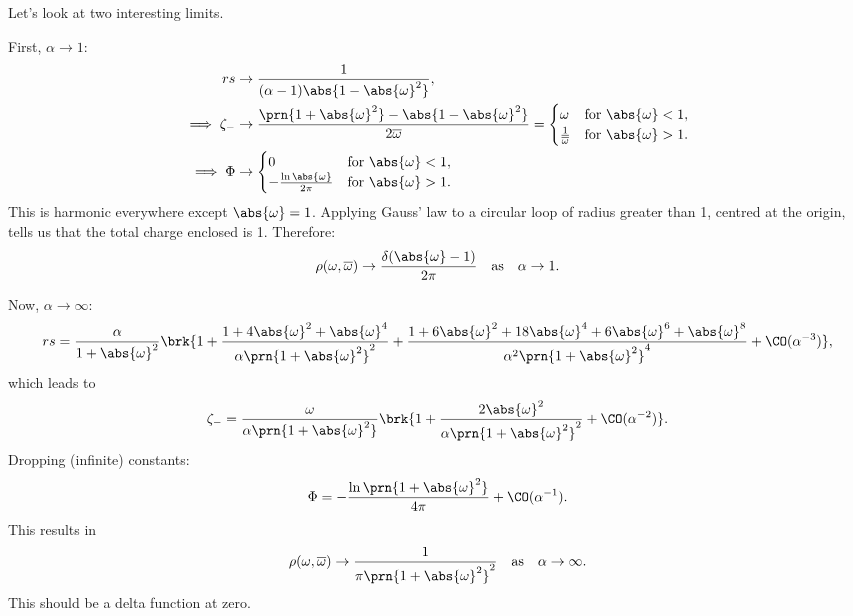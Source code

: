 \documentclass[12pt]{article}
\newcommand{\omb}{\overline{\omega}}
\newcommand{\opo}{\prn{1+\abs{\omega}^2}}
\newcommand{\omoa}{\abs{1-\abs{\omega}^2}}
\begin{document}
Let's look at two interesting limits.

First, $\alpha\to1$:
%
\begin{equation}\label{eq:rszmphiato1}
\begin{aligned}
  rs &\to \frac{1}{(\alpha-1)\omoa},\\
  \implies\zeta_- &\to \frac{\opo-\omoa}{2\omb} =
     \begin{cases}
       \omega &\text{for } \abs{\omega}<1,\\
       \frac{1}{\omb} &\text{for } \abs{\omega}>1.\\
     \end{cases}\\
  \implies\Phi &\to
     \begin{cases}
       0 &\text{for } \abs{\omega}<1,\\
       -\frac{\ln\abs{\omega}}{2\pi} &\text{for } \abs{\omega}>1.\\
     \end{cases}
\end{aligned}
\end{equation}
%
This is harmonic everywhere except $\abs{\omega}=1$.
Applying Gauss' law to a circular loop of radius greater than 1, centred at the origin, tells us that the total charge enclosed is 1.
Therefore:
%
\begin{equation}\label{eq:rhoato1}
  \rho(\omega,\omb) \to \frac{\delta(\abs{\omega}-1)}{2\pi}
  \quad\text{as}\quad \alpha\to1.
\end{equation}
%


Now, $\alpha\to\infty$:
%
\begin{equation}\label{eq:rsatoinfty}
  rs =
  \frac{\alpha}{1+\abs{\omega}^2} \brk{1 + \frac{1+4\abs{\omega}^2+\abs{\omega}^4}{\alpha\opo^2}
       + \frac{1+6\abs{\omega}^2+18\abs{\omega}^4+6\abs{\omega}^6+\abs{\omega}^8}{\alpha^2\opo^4}
       + \CO(\alpha^{-3})},
\end{equation}
%
which leads to
%
\begin{equation}\label{eq:zmatoinfty}
  \zeta_- =
  \frac{\omega}{\alpha\opo} \brk{1 + \frac{2\abs{\omega}^2}{\alpha\opo^2} + \CO(\alpha^{-2})}.
\end{equation}
%
Dropping (infinite) constants:
%
\begin{equation}\label{eq:phiatoinfty}
  \Phi = -\frac{\ln\opo}{4\pi} + \CO(\alpha^{-1}).
\end{equation}
%
This results in
%
\begin{equation}\label{eq:rhoatoinfty}
  \rho(\omega,\omb) \to \frac{1}{\pi\opo^2}
  \quad\text{as}\quad
  \alpha\to\infty.
\end{equation}
%
This should be a delta function at zero.
\end{document}
